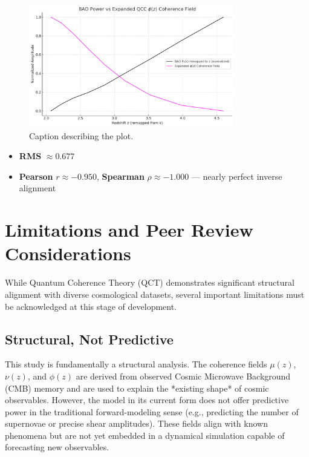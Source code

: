 \documentclass[12pt]{article}
\begin{document}
	\begin{figure}[htbp]
		\centering
		\includegraphics[width=0.8\textwidth]{BAOvsQCCexpandedtotal.png}
		\caption{Caption describing the plot.}
		\label{fig:BAOvsQCCexpanded}
	\end{figure}
	
	\begin{itemize}
		\item \textbf{RMS} $\approx 0.677$
		\item \textbf{Pearson} \( r \approx -0.950 \), \textbf{Spearman} \( \rho \approx -1.000 \) — nearly perfect inverse alignment
	\end{itemize}
	
	\section{Limitations and Peer Review Considerations}
	
	While Quantum Coherence Theory (QCT) demonstrates significant structural alignment with diverse cosmological datasets, several important limitations must be acknowledged at this stage of development.
	
	\subsection*{Structural, Not Predictive}
	This study is fundamentally a structural analysis. The coherence fields \( \mu(z) \), \( \nu(z) \), and \( \phi(z) \) are derived from observed Cosmic Microwave Background (CMB) memory and are used to explain the *existing shape* of cosmic observables. However, the model in its current form does not offer predictive power in the traditional forward-modeling sense (e.g., predicting the number of supernovae or precise shear amplitudes). These fields align with known phenomena but are not yet embedded in a dynamical simulation capable of forecasting new observables.
	
\end{document}
